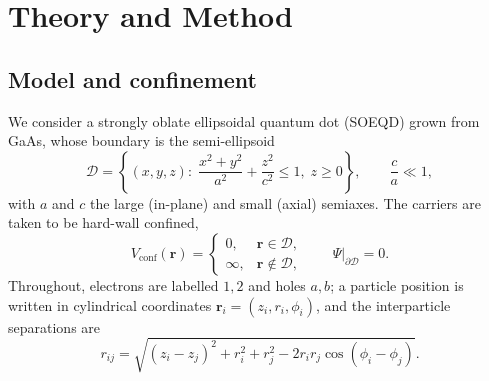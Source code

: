 
\section{Theory and Method}
\label{sec:theory}

\subsection{Model and confinement}

We consider a strongly oblate ellipsoidal quantum dot (SOEQD) grown from GaAs,
whose boundary is the semi-ellipsoid
\begin{equation}
  \mathcal{D}=\left\{(x,y,z):\;\frac{x^{2}+y^{2}}{a^{2}}+\frac{z^{2}}{c^{2}}\le 1,\;z\ge 0\right\},
  \qquad \frac{c}{a}\ll 1 ,
  \label{eq:domain}
\end{equation}
with $a$ and $c$ the large (in-plane) and small (axial) semiaxes. The carriers
are taken to be hard-wall confined,
\begin{equation}
  V_{\mathrm{conf}}(\mathbf r)=
  \begin{cases}
    0, & \mathbf r\in\mathcal{D},\\[2pt]
    \infty, & \mathbf r\notin\mathcal{D},
  \end{cases}
  \qquad \Psi\big|_{\partial\mathcal{D}}=0 .
  \label{eq:hardwall}
\end{equation}
Throughout, electrons are labelled $1,2$ and holes $a,b$; a particle position is
written in cylindrical coordinates $\mathbf r_i=(z_i,r_i,\phi_i)$, and the
interparticle separations are
\begin{equation}
  r_{ij}=\sqrt{(z_i-z_j)^{2}+r_i^{2}+r_j^{2}-2r_ir_j\cos(\phi_i-\phi_j)} .
  \label{eq:pairdist}
\end{equation}

